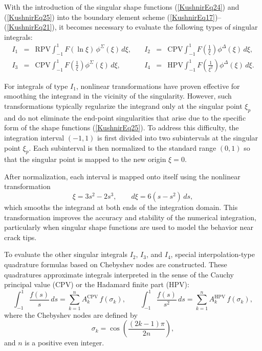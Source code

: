 With the introduction of the singular shape functions
(\ref{KushnirEq24}) and (\ref{KushnirEq25}) into the boundary element
scheme (\ref{KushnirEq17})--(\ref{KushnirEq21}), it becomes necessary
to evaluate the following types of singular integrals:
\begin{equation}
	\begin{array}{rclrcl}
		
		I_{1} &=& \displaystyle\mathrm{RPV}\int_{-1}^{1} F(\ln\xi)\,
		\phi^{\Sigma}(\xi)\,d\xi,
		\quad &
		I_{2} &=& \displaystyle\mathrm{CPV}\int_{-1}^{1} F\!\left(\frac{1}{\xi}\right)
		\phi^{\Delta}(\xi)\,d\xi,
		\\[1em]
		I_{3} &=& \displaystyle\mathrm{CPV}\int_{-1}^{1} F\!\left(\frac{1}{\xi}\right)
		\phi^{\Sigma}(\xi)\,d\xi,
		\quad &
		I_{4} &=& \displaystyle\mathrm{HPV}\int_{-1}^{1} F\!\left(\frac{1}{\xi^{2}}\right)
		\phi^{\Delta}(\xi)\,d\xi .
	\end{array}
	\label{KushnirEq27}
\end{equation}

For integrals of type $I_{1}$, nonlinear transformations have proven
effective for smoothing the integrand in the vicinity of the
singularity. However, such transformations typically regularize the
integrand only at the singular point $\xi_{p}$ and do not eliminate
the end-point singularities that arise due to the specific form of
the shape functions (\ref{KushnirEq25}). To address this difficulty,
the integration interval $(-1,1)$ is first divided into two
subintervals at the singular point $\xi_{p}$. Each subinterval is then
normalized to the standard range $(0,1)$ so that the singular point
is mapped to the new origin $\xi=0$.

After normalization, each interval is mapped onto itself using the
nonlinear transformation
\begin{equation}
	\xi = 3s^{2}-2s^{3},
	\qquad
	d\xi = 6(s-s^{2})\,ds,
	\label{KushnirEq28}
\end{equation}
which smooths the integrand at both ends of the integration domain.
This transformation improves the accuracy and stability of the
numerical integration, particularly when singular shape functions are
used to model the behavior near crack tips.

To evaluate the other singular integrals $I_{2}$, $I_{3}$, and $I_{4}$,
special interpolation-type quadrature formulas based on Chebyshev nodes
are constructed. These quadratures approximate integrals interpreted
in the sense of the Cauchy principal value (CPV) or the Hadamard
finite part (HPV):
\begin{equation}
	\int_{-1}^{1}\frac{f(s)}{s}\,ds
	=
	\sum_{k=1}^{n}A_{k}^{\mathrm{CPV}}\,f(\sigma_{k}),
	\qquad
	\int_{-1}^{1}\frac{f(s)}{s^{2}}\,ds
	=
	\sum_{k=1}^{n}A_{k}^{\mathrm{HPV}}\,f(\sigma_{k}),
	\label{KushnirEq29}
\end{equation}
where the Chebyshev nodes are defined by
\[
\sigma_{k}
=
\cos\!\left(\frac{(2k-1)\pi}{2n}\right),
\]
and $n$ is a positive even integer.

